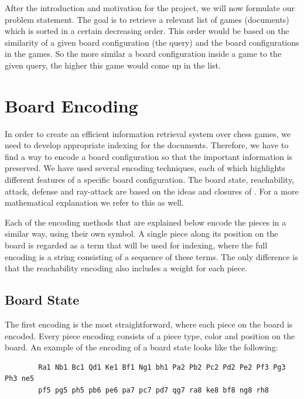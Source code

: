 \documentclass[11pt]{article}
\begin{document}
    After the introduction and motivation for the project, we will now formulate our problem statement. The goal is to retrieve a relevant list of games (documents) which is sorted in a certain decreasing order. This order would be based on the similarity of a given board configuration (the query) and the board configurations in the games. So the more similar a board configuration inside a game to the given query, the higher this game would come up in the list.



    \section{Board Encoding}

    In order to create an efficient information retrieval system over chess games, we need to develop appropriate indexing for the documents. Therefore, we have to find a way to encode a board configuration so that the important information is preserved. We have used several encoding techniques, each of which highlights different features of a specific board configuration. The board state, reachability, attack, defense and ray-attack are based on the ideas and closures of \cite{SimilarChessPositions}. For a more mathematical explanation we refer to this as well.

    Each of the encoding methods that are explained below encode the pieces in a similar way, using their own symbol. A single piece along its position on the board is regarded as a term that will be used for indexing, where the full encoding is a string consisting of a sequence of these terms. The only difference is that the reachability encoding also includes a weight for each piece.

    \subsection{Board State}

    The first encoding is the most straightforward, where each piece on the board is encoded. Every piece encoding consists of a piece type, color and position on the board. An example of the encoding of a board state looks like the following:

    \begin{verbatim}
        Ra1 Nb1 Bc1 Qd1 Ke1 Bf1 Ng1 bh1 Pa2 Pb2 Pc2 Pd2 Pe2 Pf3 Pg3 Ph3 ne5
        pf5 pg5 ph5 pb6 pe6 pa7 pc7 pd7 qg7 ra8 ke8 bf8 ng8 rh8
    \end{verbatim}
\end{document}

